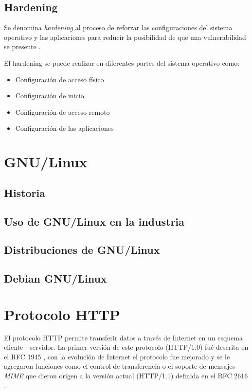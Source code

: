   \subsection {Hardening}

Se denomina \textit{hardening} al proceso de reforzar las configuraciones del sistema operativo y las aplicaciones para reducir la posibilidad de que una vulnerabilidad se presente \cite{padilla_buenas_2009}.

El hardening se puede realizar en diferentes partes del sistema operativo como:

\begin{itemize}
  \item Configuraci\'{o}n de acceso f\'{i}sico
  \item Configuraci\'{o}n de inicio
  \item Configuraci\'{o}n de acceso remoto
  \item Configuraci\'{o}n de las aplicaciones
\end{itemize}

\section {GNU/Linux}
  \subsection {Historia}
  \subsection {Uso de GNU/Linux en la industria}
  \subsection {Distribuciones de GNU/Linux}
  \subsection {Debian GNU/Linux}

\section {Protocolo HTTP}

El protocolo HTTP permite transferir datos a trav\'{e}s de Internet en un esquema cliente - servidor. La primer versi\'{o}n de este protocolo (HTTP/1.0) fu\'{e} descrita en el RFC 1945 \cite{rfc1945}, con la evoluci\'{o}n de Internet el protocolo fue mejorado y se le agregaron funciones como el control de transferencia o el soporte de mensajes \textit{MIME} que dieron origen a la versi\'{o}n actual (HTTP/1.1) definida en el RFC 2616 \cite{rfc2616}.

